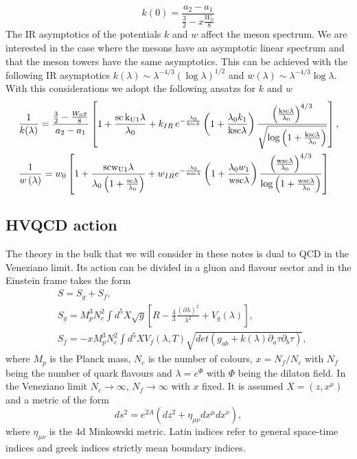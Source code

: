 \documentclass[a4paper,12pt]{article}
\begin{document}
\begin{equation}
k(0) = \frac{a_2 - a_1}{ \frac{3}{2} - x \frac{W_0}{8} }
\end{equation}
The IR asymptotics of the potentials $k$ and $w$ affect the meson spectrum. We are interested in the case where the mesons have an asymptotic linear spectrum and that the meson towers have the same asymptotics. This can be achieved with the following IR asymptotics $k(\lambda) \sim \lambda^{-4/3} {\left(\log \lambda\right)}^{1/2}$ and $w(\lambda) \sim \lambda^{-4/3} \log \lambda$. With this considerations we adopt the following ansatzs for $k$ and $w$
\begin{align}
& \frac{1}{k(\lambda)} =  \frac{ \frac{3}{2} - \frac{W_0 x}{8}}{a_2 - a_1} \left[ 1+ \frac{\rm{sc} \, k_{U1} \lambda}{\lambda_0} + k_{IR} \, e^{-\frac{\lambda_0}{\rm{ksc} \lambda}} \left( 1 + \frac{\lambda_0 k_1}{\rm{ksc} \lambda}\right) \frac{{\left(\frac{\rm{ksc} \lambda}{\lambda_0}\right)}^{4/3}}{\sqrt{\log\left(1 + \frac{\rm{ksc} \lambda}{\lambda_0}\right)}}\right], \\
& \frac{1}{w\left(\lambda\right)} = w_0 \left[1 + \frac{\rm{sc} w_{U1} \lambda}{\lambda_0 \left( 1+ \frac{\rm{sc} \lambda}{\lambda_0}\right)} + w_{IR} e^{- \frac{\lambda_0}{\rm{wsc} \lambda}} \left(1+\frac{\lambda_0 w_1}{\rm{wsc} \lambda}\right)\frac{{\left( \frac{\rm{wsc} \lambda}{\lambda_0}\right)}^{4/3}}{\log\left(1+\frac{\rm{wsc} \lambda}{\lambda_0}\right)} \right]
\end{align}





\subsection{HVQCD action}

The theory in the bulk that we will consider in these notes is dual to QCD in the Veneziano limit. Its action can be divided in a gluon and flavour sector and in the Einstein frame takes the form
\begin{align}
&S = S_g + S_f, \\
&S_g =  M_p^3 N_c^2 \int d^5X \sqrt{g} \left[ R - \frac{4}{3} \frac{{\left( \partial \lambda \right)}^2}{\lambda^2}+ V_g \left( \lambda\right) \right], \\
&S_f = - x M_p^3 N_c^2 \int d^5 X V_f\left(\lambda, T\right) \sqrt{det\left(g_{ab} + k\left(\lambda\right) \partial_a \tau \partial_b \tau \right)},
\label{eq: HVQCD action}
\end{align}
where $M_p$ is the Planck mass, $N_c$ is the number of colours, $x = N_f / N_c$ with $N_f$ being the number of quark flavours and $\lambda = e^{\Phi}$ with $\Phi$ being the dilaton field. In the Veneziano limit $N_c \to \infty, \, N_f \to \infty$ with $x$ fixed. It is assumed $X = \left(z, x^\mu \right)$ and a metric of the form
\begin{equation}
\label{eq: metric definition}
ds^2 = e^{2 A} \left( d z^2 + \eta_{\mu \nu} dx^\mu dx^\nu \right),
\end{equation}
where $\eta_{\mu\nu}$ is the 4d Minkowski metric. Latin indices refer to general space-time indices and greek indices strictly mean boundary indices.
\end{document}
